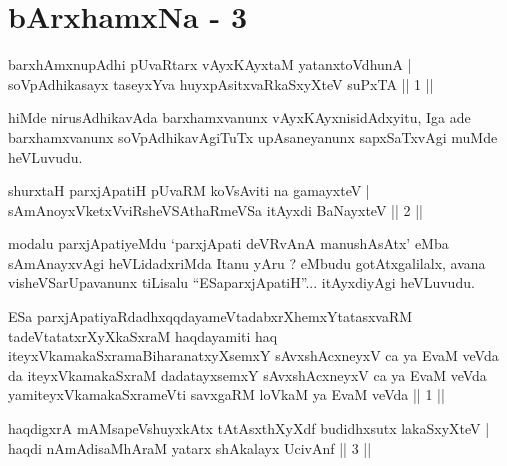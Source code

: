 
\chapter{bArxhamxNa - 3}
 \begin{shl}
barxhAmxnupAdhi pUvaRtarx vAyxKAyxtaM yatanxtoV\s dhunA | \\
soVpAdhikasayx taseyxYva huyxpAsitxvaRkaSxyXteV suPxTA \hfill ||  1 || 
\end{shl}

\begin{artha}
hiMde nirusAdhikavAda barxhamxvanunx vAyxKAyxnisidAdxyitu, Iga ade barxhamxvanunx soVpAdhikavAgiTuTx upAsaneyanunx sapxSaTxvAgi muMde heVLuvudu.
\end{artha}

\begin{shl}
shurxtaH parxjApatiH pUvaRM koV\s sAviti na gamayxteV | \\
sAmAnoyxVketxVviRsheVSAthaRmeVSa itAyxdi BaNayxteV \hfill ||  2 || 
\end{shl}	

\begin{artha}
modalu parxjApatiyeMdu `parxjApati deVRvAnA manushAsAtx' eMba sAmAnayxvAgi heVLidadxriMda Itanu yAru ? eMbudu gotAtxgalilalx, avana visheVSarUpavanunx tiLisalu ``ESaparxjApatiH''... itAyxdiyAgi heVLuvudu.
\end{artha}

\begin{shl}
ESa parxjApatiyaRdadhxqqdayameVtadabxrXhemxYtatasxvaRM tadeVtatatxrXyXkaSxraM haqdayamiti haq iteyxVkamakaSxramaBiharanatxyXsemxY sAvxshAcxneyxV ca ya EvaM veVda da iteyxVkamakaSxraM dadatayxsemxY sAvxshAcxneyxV ca ya EvaM veVda yamiteyxVkamakaSxrameVti savxgaRM loVkaM ya EvaM veVda || 1 ||
\end{shl}


\begin{shl}
haqdigxrA mAMsapeVshuyxkAtx tAtAsxthXyXdf budidhxsutx lakaSxyXteV | \\
haqdi nAmAdisaMhAraM yatarx shAkalayx UcivAnf \hfill ||  3 || 
\end{shl}

